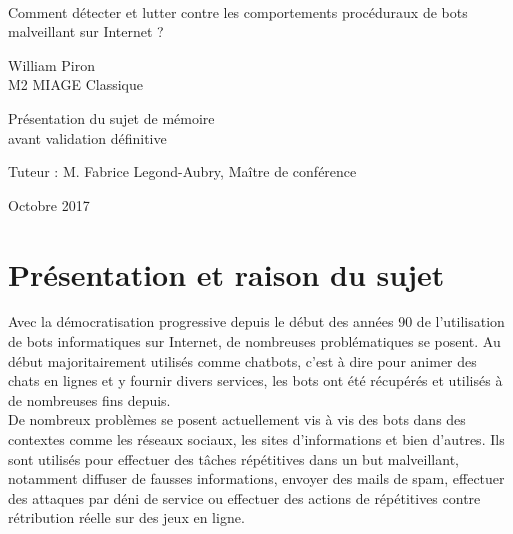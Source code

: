 \documentclass[12pt,a4paper,oldfontcommands]{memoir}
\begin{document}
\thispagestyle{empty}

{%
\sffamily
\centering
\Large

~\vspace{\fill}

{\huge 
Comment détecter et lutter contre les comportements procéduraux de bots malveillant sur Internet ?
}

\vspace{2.5cm}

{\LARGE
William Piron\\
M2 MIAGE Classique
}

\vspace{3.5cm}

Présentation du sujet de mémoire\\
avant validation définitive

\vspace{3.5cm}

Tuteur : M. Fabrice Legond-Aubry, Maître de conférence

\vspace{\fill}

Octobre 2017

}%

\clearpage
\tableofcontents
\thispagestyle{empty}

\clearpage


\section*{Présentation et raison du sujet}

Avec la démocratisation progressive depuis le début des années 90 de l'utilisation de bots informatiques sur Internet, de nombreuses problématiques se posent. Au début majoritairement utilisés comme chatbots, c'est à dire pour animer des chats en lignes et y fournir divers services, les bots ont été récupérés et utilisés à de nombreuses fins depuis.\\

De nombreux problèmes se posent actuellement vis à vis des bots dans des contextes comme les réseaux sociaux, les sites d'informations et bien d'autres. Ils sont utilisés pour effectuer des tâches répétitives dans un but malveillant, notamment diffuser de fausses informations, envoyer des mails de spam, effectuer des attaques par déni de service ou effectuer des actions de répétitives contre rétribution réelle sur des jeux en ligne.\\
\end{document}
